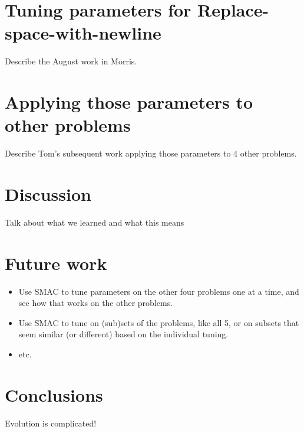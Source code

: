 \documentclass{llncs}
\begin{document}
\section{Tuning parameters for Replace-space-with-newline}

Describe the August work in Morris.
\label{sec:tuningRSWN}

\section{Applying those parameters to other problems}
\label{sec:applyingToOtherProblems}

Describe Tom's subsequent work applying those parameters to 4 other
problems.

\section{Discussion}
\label{sec:discussion}

Talk about what we learned and what this means

\section{Future work}
\label{sec:futureWork}

\begin{itemize}
	\item Use SMAC to tune parameters on the other four problems one at a time, and see how that works on the other problems.
	\item Use SMAC to tune on (sub)sets of the problems, like all 5, or on subsets that seem similar (or different) based on the individual tuning.
	\item etc.
\end{itemize}

\section{Conclusions}
\label{sec:conclusion}

Evolution is complicated!
\end{document}
